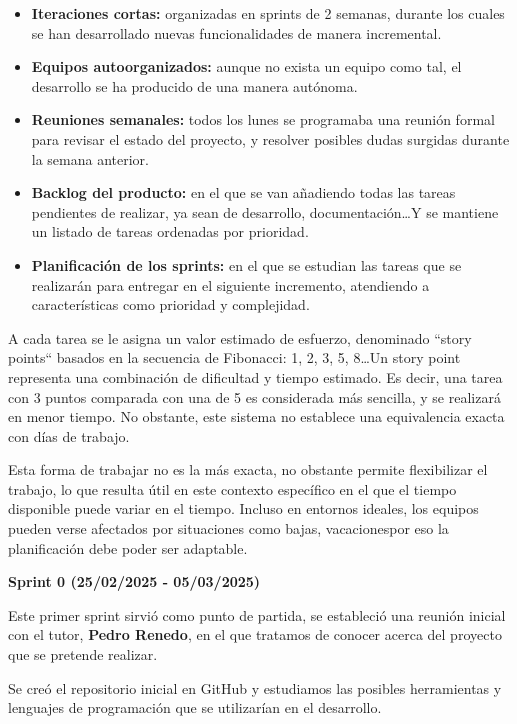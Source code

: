 \begin{itemize}
    \item \textbf{Iteraciones cortas:} organizadas en sprints de 2 semanas, durante los cuales se han desarrollado
    nuevas funcionalidades de manera incremental.
    \item \textbf{Equipos autoorganizados:} aunque no exista un equipo como tal, el desarrollo se ha producido de una manera autónoma.
    \item \textbf{Reuniones semanales:} todos los lunes se programaba una reunión formal para revisar el estado del proyecto, y
    resolver posibles dudas surgidas durante la semana anterior.
    \item \textbf{Backlog del producto:} en el que se van añadiendo todas las tareas pendientes de realizar, ya sean de
    desarrollo, documentación\ldots Y se mantiene un listado de tareas ordenadas por prioridad.
    \item \textbf{Planificación de los sprints:} en el que se estudian las tareas que se realizarán para entregar en el
    siguiente incremento, atendiendo a características como prioridad y complejidad.
\end{itemize}

A cada tarea se le asigna un valor estimado de esfuerzo, denominado ``story points`` basados en la secuencia de
Fibonacci: 1, 2, 3, 5, 8\ldots Un story point representa una combinación de dificultad y tiempo estimado.
Es decir, una tarea con 3 puntos comparada con una de 5 es considerada más sencilla, y se realizará en menor tiempo.
No obstante, este sistema no establece una equivalencia exacta con días de trabajo.

Esta forma de trabajar no es la más exacta, no obstante permite flexibilizar el trabajo, lo que resulta útil en este contexto
específico en el que el tiempo disponible puede variar en el tiempo.
Incluso en entornos ideales, los equipos pueden verse afectados por situaciones como bajas, vacaciones\ldtos por eso la
planificación debe poder ser adaptable.


\textbf{Sprint 0 (25/02/2025 - 05/03/2025)}

Este primer sprint sirvió como punto de partida, se estableció una reunión inicial con el tutor, \textbf{Pedro Renedo}, en el que
tratamos de conocer acerca del proyecto que se pretende realizar.

Se creó el repositorio inicial en GitHub y estudiamos las posibles herramientas y lenguajes de programación que se utilizarían
en el desarrollo.

